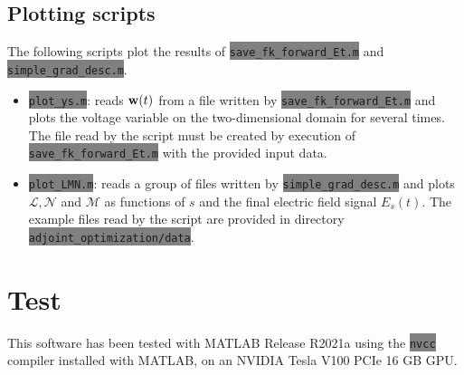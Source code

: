 \documentclass{article}
\newcommand{\code}[1]{\colorbox{gray}{\lstinline|#1|}}
\begin{document}
\subsection{Plotting scripts}
\label{sec:plotting}
The following scripts plot the results of \code{save_fk_forward_Et.m} and \code{simple_grad_desc.m}.

\begin{itemize}
\item \code{plot_ys.m}: reads ${\bf w}(t)$ from a file written by \code{save_fk_forward_Et.m} and plots the voltage variable on the two-dimensional domain for several times. The file read by the script must be created by execution of \code{save_fk_forward_Et.m} with the provided input data. %


  
\item \code{plot_LMN.m}: reads a group of files written by \code{simple_grad_desc.m} and plots $\mathcal{L}, \mathcal{N}$ and $\mathcal{M}$ as functions of $s$ and the final electric field signal $E_s(t)$. The example files read by the script are provided in directory \code{adjoint_optimization/data}.

\end{itemize}

\section{Test}
This software has been tested with MATLAB Release R2021a using the \code{nvcc} compiler installed with MATLAB, on an NVIDIA Tesla V100 PCIe 16 GB GPU.

% 
% 


\end{document}
